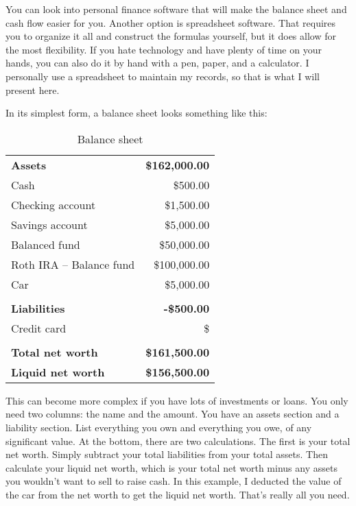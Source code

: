 You can look into personal finance software that will make the balance sheet and cash flow easier for you. Another option is spreadsheet software. That requires you to organize it all and construct the formulas yourself, but it does allow for the most flexibility. If you hate technology and have plenty of time on your hands, you can also do it by hand with a pen, paper, and a calculator. I personally use a spreadsheet to maintain my records, so that is what I will present here.

In its simplest form, a balance sheet looks something like this:

\begin{table}[ht]
\caption{Balance sheet}
\centering
\begin{tabular}{l r}
\\\hline
\\\hline
\textbf{Assets} & \textbf{\$162,000.00}\\
\hline
Cash & \$500.00\\
Checking account & \$1,500.00\\
Savings account & \$5,000.00\\
Balanced fund & \$50,000.00\\
Roth IRA -- Balance fund & \$100,000.00\\
Car & \$5,000.00\\
\\
\textbf{Liabilities} & {\color{red} \textbf{-\$500.00}}\\
\hline
Credit card & {\color{red} \$\-500.00}\\
\\
\textbf{Total net worth} & \textbf{\$161,500.00}\\
\textbf{Liquid net worth} & \textbf{\$156,500.00}\\
\end{tabular}
\end{table}

This can become more complex if you have lots of investments or loans. You only need two columns: the name and the amount. You have an assets section and a liability section. List everything you own and everything you owe, of any significant value. At the bottom, there are two calculations. The first is your total net worth. Simply subtract your total liabilities from your total assets. Then calculate your liquid net worth, which is your total net worth minus any assets you wouldn't want to sell to raise cash. In this example, I deducted the value of the car from the net worth to get the liquid net worth. That's really all you need.

